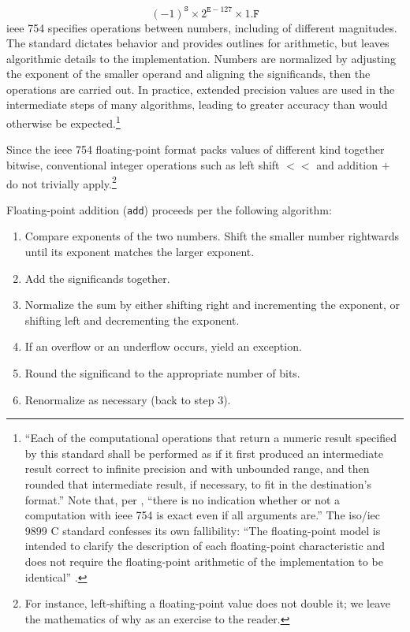 \documentclass[twoside]{article}
\begin{document}
$$
(-1)^{\texttt{S}} \times 2^{\texttt{E}-127} \times 1.\texttt{F}
$$
\noindent
{\sc ieee} 754 specifies operations between numbers, including of different magnitudes.  The standard dictates behavior and provides outlines for arithmetic, but leaves algorithmic details to the implementation.  Numbers are normalized by adjusting the exponent of the smaller operand and aligning the significands, then the operations are carried out.  In practice, extended precision values are used in the intermediate steps of many algorithms, leading to greater accuracy than would otherwise be expected.\footnote{“Each of the computational operations that return a numeric result specified by this standard shall be performed as if it first produced an intermediate result correct to infinite precision and with unbounded range, and then rounded that intermediate result, if necessary, to fit in the destination’s format.”  \citep{IEEE754-2008}  Note that, per \citeauthor{Risse2016}, “there is no indication whether or not a computation with {\sc ieee} 754 is exact even if all arguments are.”  The {\sc iso}/{\sc iec} 9899 C standard confesses its own fallibility:  “The floating-point model is intended to clarify the description of each floating-point characteristic and does not require the floating-point arithmetic of the implementation to be identical” \citetext{\citet{ISO9899}, fn.~21}.}

Since the {\sc ieee} 754 floating-point format packs values of different kind together bitwise, conventional integer operations such as left shift $<<$ and addition $+$ do not trivially apply.\footnote{For instance, left-shifting a floating-point value does not double it; we leave the mathematics of why as an exercise to the reader.}

Floating-point addition (\texttt{add}) proceeds per the following algorithm:

\begin{enumerate}
  \item  Compare exponents of the two numbers.  Shift the smaller number rightwards until its exponent matches the larger exponent.
  \item  Add the significands together.
  \item  Normalize the sum by either shifting right and incrementing the exponent, or shifting left and decrementing the exponent.
  \item  If an overflow or an underflow occurs, yield an exception.
  \item  Round the significand to the appropriate number of bits.
  \item  Renormalize as necessary (back to step 3).
\end{enumerate}
\end{document}
